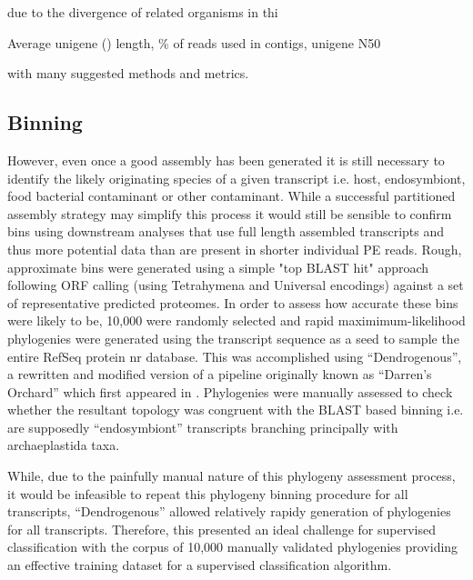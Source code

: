 due to the divergence
of related organisms in thi






Average unigene () length, \% of reads used in contigs, unigene N50






with many suggested methods and metrics.





\subsection{Binning}

However, even once a good assembly has been generated it is still necessary to identify the likely
originating species of a given transcript i.e. host, endosymbiont, food bacterial contaminant or other
contaminant.  While a successful partitioned assembly strategy may simplify this process it would still
be sensible to confirm bins using downstream analyses that use full length assembled transcripts and thus
more potential data than are present in shorter individual PE reads.  Rough, approximate bins were
generated using a simple "top BLAST hit" approach following ORF calling (using Tetrahymena and Universal
encodings) against a set of representative predicted proteomes.  In order to assess how accurate these
bins were likely to be, 10,000 were randomly selected and rapid maximimum-likelihood phylogenies were
generated using the transcript sequence as a seed to sample the entire RefSeq protein nr database.
This was accomplished using ``Dendrogenous'', a rewritten and modified version of a pipeline originally known 
as ``Darren's Orchard'' which first appeared in \citep{Richards2009g}.  Phylogenies were manually assessed to check
whether the resultant topology was congruent with the BLAST based binning i.e. are supposedly ``endosymbiont''
transcripts branching principally with archaeplastida taxa.  


While, due to the painfully manual nature of this phylogeny assessment process, 
it would be infeasible to repeat this phylogeny binning procedure for all transcripts, ``Dendrogenous'' allowed
relatively rapidy generation of phylogenies for all transcripts.  Therefore, this presented an ideal
challenge for supervised classification with the corpus of 10,000 manually validated phylogenies providing an effective
training dataset for a supervised classification algorithm.  









